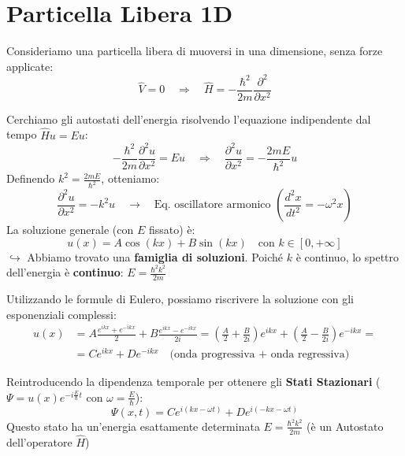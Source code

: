 \documentclass[11pt, a4paper]{article}
\begin{document}
\tableofcontents

\newpage

\section{Particella Libera 1D} %

Consideriamo una particella libera di muoversi in una dimensione, senza forze applicate: %
\begin{equation*}
    \boxed{ \hat{V} = 0 } \quad \Rightarrow \quad \hat{H} = -\frac{\hbar^2}{2m} \frac{\partial^2}{\partial x^2} %
\end{equation*}

\noindent
Cerchiamo gli autostati dell'energia risolvendo l'equazione indipendente dal tempo $\hat{H}u = Eu$: %
\begin{equation*}
    -\frac{\hbar^2}{2m} \frac{\partial^2 u}{\partial x^2} = E u \quad \Rightarrow \quad \frac{\partial^2 u}{\partial x^2} = -\frac{2mE}{\hbar^2} u %
\end{equation*}
Definendo $k^2 = \frac{2mE}{\hbar^2}$, otteniamo: %
\begin{equation}
    \frac{\partial^2 u}{\partial x^2} = -k^2 u \quad \rightarrow \quad \text{Eq. oscillatore armonico } \left(\frac{d^2 x}{dt^2} = -\omega^2 x\right) %
\end{equation}
La soluzione generale (con $E$ fissato) è: %
\begin{equation*}
    u(x) = A \cos(kx) + B \sin(kx) \quad \text{con } k \in [0, +\infty] %
\end{equation*}
$\hookrightarrow$ Abbiamo trovato una \textbf{famiglia di soluzioni}. Poiché $k$ è continuo, lo spettro dell'energia è \textbf{continuo}: $E = \frac{\hbar^2 k^2}{2m}$ %

\noindent
Utilizzando le formule di Eulero, possiamo riscrivere la soluzione con gli esponenziali complessi: %
\begin{align*}
    u(x) &= A \frac{e^{ikx} + e^{-ikx}}{2} + B \frac{e^{ikx} - e^{-ikx}}{2i} = \left( \frac{A}{2} + \frac{B}{2i} \right) e^{ikx} + \left( \frac{A}{2} - \frac{B}{2i} \right) e^{-ikx} = \\ %
         &= C e^{ikx} + D e^{-ikx} \quad \text{(onda progressiva + onda regressiva)} %
\end{align*}

\noindent
Reintroducendo la dipendenza temporale per ottenere gli \textbf{Stati Stazionari} ($\Psi = u(x) e^{-i\frac{E}{\hbar}t}$ con $\omega = \frac{E}{\hbar}$): %
\begin{equation}
    \Psi(x,t) = C e^{i(kx - \omega t)} + D e^{i(-kx - \omega t)} %
\end{equation}
Questo stato ha un'energia esattamente determinata $E = \frac{\hbar^2 k^2}{2m}$ (è un Autostato dell'operatore $\hat{H}$) %
\end{document}
